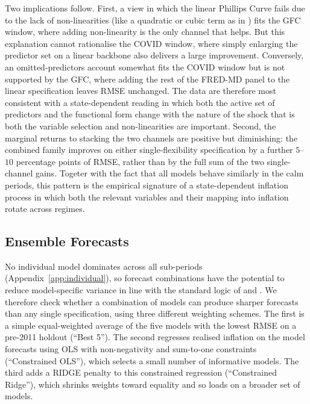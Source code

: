 \documentclass[12pt,a4paper]{article}
\begin{document}
Two implications follow. First, a view in which the linear Phillips Curve fails due to the lack of non-linearities (like a quadratic or cubic term as in \cite{ball2022,gitti2024}) fits the GFC window, where adding non-linearity is the only channel that helps. But this explanation cannot rationalise the COVID window, where simply enlarging the predictor set on a linear backbone also delivers a large improvement. Conversely, an omitted-predictors account \citep{bernanke2023} somewhat fits the COVID window but is not supported by the GFC, where adding the rest of the FRED-MD panel to the linear specification leaves RMSE unchanged. The data are therefore most consistent with a state-dependent reading in which both the active set of predictors and the functional form change with the nature of the shock that is both the variable selection and non-linearities are important. Second, the marginal returns to stacking the two channels are positive but diminishing: the combined family improves on either single-flexibility specification by a further $5$--$10$ percentage points of RMSE, rather than by the full sum of the two single-channel gains. Togeter with the fact that all models behave similarly in the calm periods, this pattern is the empirical signature of a state-dependent inflation process in which both the relevant variables and their mapping into inflation rotate across regimes.

\subsection{Ensemble Forecasts}
\label{subsec:ensemble_results}

No individual model dominates across all sub-periods (Appendix~\ref{app:individual}), so forecast combinations have the potential to reduce model-specific variance in line with the standard logic of \citet{batesgranger1969} and \citet{timmermann2006}. We therefore check whether a combination of models can produce sharper forecasts than any single specification, using three different weighting schemes. The first is a simple equal-weighted average of the five models with the lowest RMSE on a pre-2011 holdout (``Best 5''). The second regresses realised inflation on the model forecasts using OLS with non-negativity and sum-to-one constraints (``Constrained OLS''), which selects a small number of informative models. The third adds a RIDGE penalty to this constrained regression (``Constrained Ridge''), which shrinks weights toward equality and so loads on a broader set of models.
\end{document}
